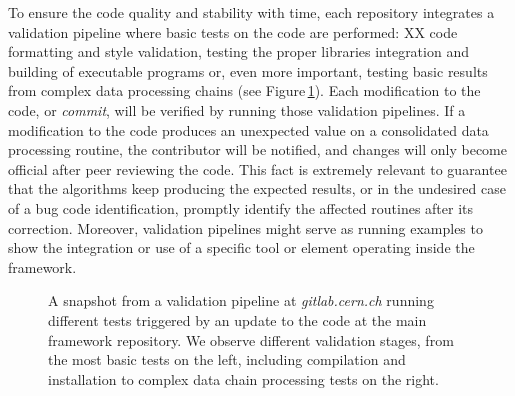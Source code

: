 

To ensure the code quality and stability with time, each repository integrates a validation pipeline where basic tests on the code are performed: XX code formatting and style validation, testing the proper libraries integration and building of executable programs or, even more important, testing basic results from complex data processing chains (see Figure\,\ref{fig:pipelines}). Each modification to the code, or \emph{commit}, will be verified by running those validation pipelines. If a modification to the code produces an unexpected value on a consolidated data processing routine, the contributor will be notified, and changes will only become official after peer reviewing the code. This fact is extremely relevant to guarantee that the algorithms keep producing the expected results, or in the undesired case of a bug code identification, promptly identify the affected routines after its correction. Moreover, validation pipelines might serve as running examples to show the integration or use of a specific tool or element operating inside the framework.



\begin{figure}[h]
  \centering
	\caption{A snapshot from a validation pipeline at \emph{gitlab.cern.ch} running different tests triggered by an update to the code at the main framework repository. We observe different validation stages, from the most basic tests on the left, including compilation and installation to complex data chain processing tests on the right.}\label{fig:pipelines}
\end{figure}
